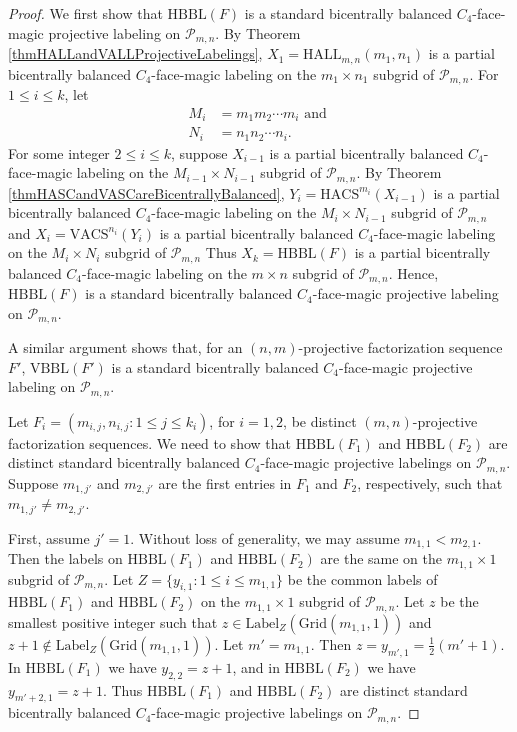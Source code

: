 \documentclass[12pt]{amsart}
\theoremstyle{definition}
\theoremstyle{plain}
\begin{document}
\begin{proof}
  We first show that $\mathrm{HBBL}(F)$ is a standard bicentrally balanced $C_4$-face-magic projective labeling on $\mathcal{P}_{m,n}$.
  By Theorem \ref{thmHALLandVALLProjectiveLabelings}, $X_1 =\mathrm{HALL}_{m,n}(m_1,n_1)$ is a partial
  bicentrally balanced $C_4$-face-magic labeling on the $m_1 \times n_1$ subgrid of $\mathcal{P}_{m,n}$.
  For $1 \leqslant i \leqslant k$, let
  \begin{align*}
    M_i &= m_1 m_2 \cdots m_i \mbox{ and } \\
    N_i &= n_1 n_2 \cdots n_i.
  \end{align*}
  For some integer $2 \leqslant i \leqslant k$, suppose $X_{i-1}$ is a  partial
  bicentrally balanced $C_4$-face-magic labeling on the $M_{i-1} \times N_{i-1}$ subgrid of $\mathcal{P}_{m,n}$.
  By Theorem \ref{thmHASCandVASCareBicentrallyBalanced}, $Y_i =\mathrm{HACS}^{m_i}(X_{i-1})$
  is a  partial bicentrally balanced $C_4$-face-magic labeling on the $M_{i} \times N_{i-1}$ subgrid of $\mathcal{P}_{m,n}$
  and $X_i =\mathrm{VACS}^{n_i}(Y_{i})$ is a  partial
  bicentrally balanced $C_4$-face-magic labeling on the $M_{i} \times N_{i}$ subgrid of $\mathcal{P}_{m,n}$
  Thus $X_k= \mathrm{HBBL}(F)$ is a  partial
  bicentrally balanced $C_4$-face-magic labeling on the $m \times n$ subgrid of $\mathcal{P}_{m,n}$.
  Hence,  $\mathrm{HBBL}(F)$ is a  standard
  bicentrally balanced $C_4$-face-magic projective labeling on $\mathcal{P}_{m,n}$.

  A similar argument shows that, for an $(n,m)$-projective factorization sequence $F'$,
  $\mathrm{VBBL}\allowbreak (F')$ is a standard bicentrally balanced $C_4$-face-magic projective labeling on $\mathcal{P}_{m,n}$.

  Let $F_i= (m_{i,j}, n_{i,j} : 1 \leqslant j \leqslant k_i)$, for $i=1,2$, be distinct $(m,n)$-projective factorization sequences.
  We need to show that $\mathrm{HBBL}(F_1)$ and $\mathrm{HBBL}(F_2)$ are distinct
  standard bicentrally balanced $C_4$-face-magic projective labelings on $\mathcal{P}_{m,n}$.
  Suppose $m_{1,j'}$ and $m_{2,j'}$ are the first entries in $F_1$ and $F_2$, respectively, such that  $m_{1,j'} \ne m_{2,j'}$.

  First, assume $j'=1$. Without loss of generality, we may assume $m_{1,1} < m_{2,1}$.
  Then the labels on $\mathrm{HBBL}(F_1)$ and $\mathrm{HBBL}(F_2)$ are the same on the $m_{1,1} \times 1$ subgrid of $\mathcal{P}_{m,n}$.
  Let $Z=\{y_{i,1} : 1 \leqslant i \leqslant m_{1,1}\}$ be the common labels of
  $\mathrm{HBBL}(F_1)$ and $\mathrm{HBBL}(F_2)$ on the $m_{1,1} \times 1$ subgrid of $\mathcal{P}_{m,n}$.
  Let $z$ be the smallest positive integer such that $z\in \mathrm{Label}_Z(\mathrm{Grid}(m_{1,1}, 1))$
  and $z+1\notin \mathrm{Label}_Z(\mathrm{Grid}(m_{1,1}, 1))$.
  Let $m'=m_{1,1}$.
  Then $z=y_{m',1}=\tfrac{1}{2}(m'+1)$.
  In $\mathrm{HBBL}(F_1)$ we have $y_{2,2}=z+1$, and
  in $\mathrm{HBBL}(F_2)$ we have $y_{m' +2,1}=z+1$.
  Thus $\mathrm{HBBL}(F_1)$ and $\mathrm{HBBL}(F_2)$ are distinct standard bicentrally balanced $C_4$-face-magic projective labelings on $\mathcal{P}_{m,n}$.


\end{proof}
\end{document}
